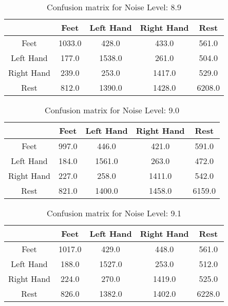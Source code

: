 \begin{table}[!htbp]
    \centering
    \begin{tabular}{|c||c|c|c|c|}
        \hline
		 & Feet & Left Hand & Right Hand & Rest \\
        \hline
        \hline
        Feet & 1033.0 & 428.0 & 433.0 & 561.0 \\
        \hline
        Left Hand & 177.0 & 1538.0 & 261.0 & 504.0 \\
        \hline
        Right Hand & 239.0 & 253.0 & 1417.0 & 529.0 \\
        \hline
        Rest & 812.0 & 1390.0 & 1428.0 & 6208.0 \\
        \hline
    \end{tabular}
    \caption{Confusion matrix for Noise Level: 8.9}
\end{table}

\begin{table}[!htbp]
    \centering
    \begin{tabular}{|c||c|c|c|c|}
        \hline
		 & Feet & Left Hand & Right Hand & Rest \\
        \hline
        \hline
        Feet & 997.0 & 446.0 & 421.0 & 591.0 \\
        \hline
        Left Hand & 184.0 & 1561.0 & 263.0 & 472.0 \\
        \hline
        Right Hand & 227.0 & 258.0 & 1411.0 & 542.0 \\
        \hline
        Rest & 821.0 & 1400.0 & 1458.0 & 6159.0 \\
        \hline
    \end{tabular}
    \caption{Confusion matrix for Noise Level: 9.0}
\end{table}

\begin{table}[!htbp]
    \centering
    \begin{tabular}{|c||c|c|c|c|}
        \hline
		 & Feet & Left Hand & Right Hand & Rest \\
        \hline
        \hline
        Feet & 1017.0 & 429.0 & 448.0 & 561.0 \\
        \hline
        Left Hand & 188.0 & 1527.0 & 253.0 & 512.0 \\
        \hline
        Right Hand & 224.0 & 270.0 & 1419.0 & 525.0 \\
        \hline
        Rest & 826.0 & 1382.0 & 1402.0 & 6228.0 \\
        \hline
    \end{tabular}
    \caption{Confusion matrix for Noise Level: 9.1}
\end{table}

